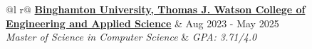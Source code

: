 \documentclass[a4paper,10pt]{extarticle}
\begin{document}
\begin{tabularx}{\linewidth}{ @{}l r@{} }
\color[HTML]{000000} \textbf{{\href{https://www.binghamton.edu/computer-science/graduate-programs/mscs/index.html}{Binghamton University, Thomas J. Watson College of Engineering and Applied Science}}} & \hfill \color[HTML]{000000} Aug 2023 - May 2025\hfill \\
\color[HTML]{000000} \textit{Master of Science in Computer Science} \color[HTML]{000000}  & \hfill \textit{GPA: 3.71/4.0} \\
\end{tabularx}


\end{document}
